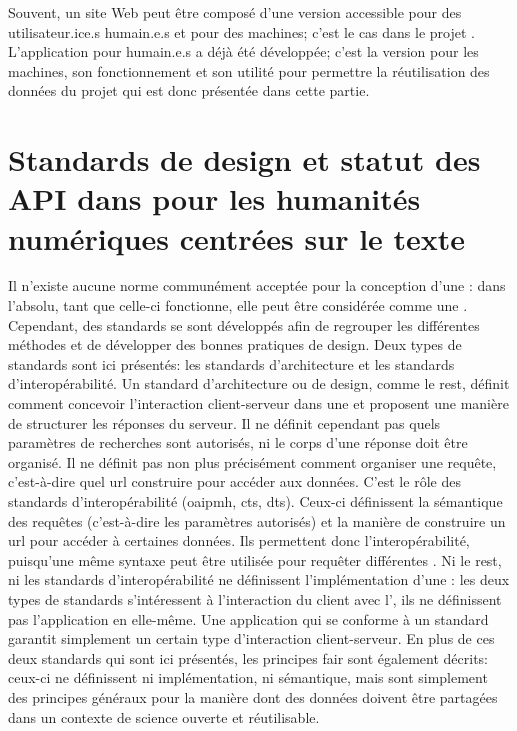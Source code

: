 Souvent, un site Web peut être composé d'une version accessible pour des utilisateur.ice.s humain.e.s et pour des machines; c'est le cas dans le projet \ktb{}. L'application pour humain.e.s a déjà été développée; c'est la version pour les machines, son fonctionnement et son utilité pour permettre la réutilisation des données du projet qui est donc présentée dans cette partie.

\chapter{Standards de design et statut des API dans pour les humanités numériques centrées sur le texte}
Il n'existe aucune norme communément acceptée pour la conception d'une \api{}: dans l'absolu, tant que celle-ci fonctionne, elle peut être considérée comme une \api{}. Cependant, des standards se sont développés afin de regrouper les différentes méthodes et de développer des bonnes pratiques de design. Deux types de standards sont ici présentés: les standards d'architecture et les standards d'interopérabilité. Un standard d'architecture ou de design, comme le \gls{rest}, définit comment concevoir l'interaction client-serveur dans une \api{} et proposent une manière de structurer les réponses du serveur. Il ne définit cependant pas quels paramètres de recherches sont autorisés, ni le corps d'une réponse doit être organisé. Il ne définit pas non plus précisément comment organiser une requête, c'est-à-dire quel \gls{url} construire pour accéder aux données. C'est le rôle des standards d'interopérabilité (\gls{oaipmh}, \gls{cts}, \gls{dts}). Ceux-ci définissent la sémantique des requêtes (c'est-à-dire les paramètres autorisés) et la manière de construire un \gls{url} pour accéder à certaines données. Ils permettent donc l'interopérabilité, puisqu'une même syntaxe peut être utilisée pour requêter différentes \api{}. Ni le \gls{rest}, ni les standards d'interopérabilité ne définissent l'implémentation d'une \api{}: les deux types de standards s'intéressent à l'interaction du client avec l'\api{}, ils ne définissent pas l'application en elle-même. Une application qui se conforme à un standard garantit simplement un certain type d'interaction client-serveur. En plus de ces deux standards qui sont ici présentés, les principes \gls{fair} sont également décrits: ceux-ci ne définissent ni implémentation, ni sémantique, mais sont simplement des principes généraux pour la manière dont des données doivent être partagées dans un contexte de science ouverte et réutilisable.

